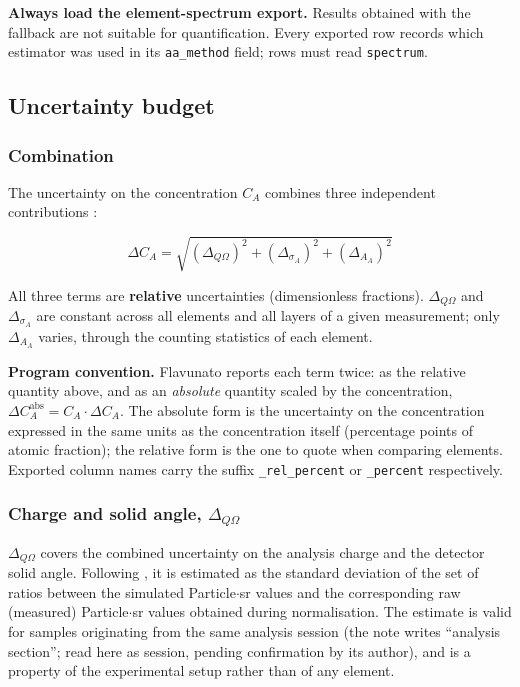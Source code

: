 \textbf{Always load the element-spectrum export.} Results obtained with
the fallback are not suitable for quantification. Every exported row
records which estimator was used in its \texttt{aa\_method} field; rows
must read \texttt{spectrum}.

\subsection{Uncertainty budget}\label{uncertainty-budget}

\subsubsection{Combination}\label{combination}

The uncertainty on the concentration \(C_A\) combines three independent
contributions \citep[Eq. 3]{diallo2025iba}:

\[
\Delta C_A = \sqrt{(\Delta_{Q\Omega})^2 + (\Delta_{\sigma_A})^2 + (\Delta_{A_A})^2} \tag{D3}
\]

All three terms are \textbf{relative} uncertainties (dimensionless
fractions). \(\Delta_{Q\Omega}\) and \(\Delta_{\sigma_A}\) are constant
across all elements and all layers of a given measurement; only
\(\Delta_{A_A}\) varies, through the counting statistics of each
element.

\textbf{Program convention.} Flavunato reports each term twice: as the
relative quantity above, and as an \emph{absolute} quantity scaled by
the concentration, \(\Delta C_A^{\text{abs}} = C_A \cdot \Delta C_A\).
The absolute form is the uncertainty on the concentration expressed in
the same units as the concentration itself (percentage points of atomic
fraction); the relative form is the one to quote when comparing
elements. Exported column names carry the suffix \texttt{\_rel\_percent}
or \texttt{\_percent} respectively.

\subsubsection{\texorpdfstring{Charge and solid angle,
\(\Delta_{Q\Omega}\)}{Charge and solid angle, \textbackslash Delta\_\{Q\textbackslash Omega\}}}\label{charge-and-solid-angle-delta_qomega}

\(\Delta_{Q\Omega}\) covers the combined uncertainty on the analysis
charge and the detector solid angle. Following \citep{diallo2025iba}, it
is estimated as the standard deviation of the set of ratios between the
simulated Particle\(\cdot\)sr values and the corresponding raw
(measured) Particle\(\cdot\)sr values obtained during normalisation. The
estimate is valid for samples originating from the same analysis session
(the note writes ``analysis section''; read here as session, pending
confirmation by its author), and is a property of the experimental setup
rather than of any element.

